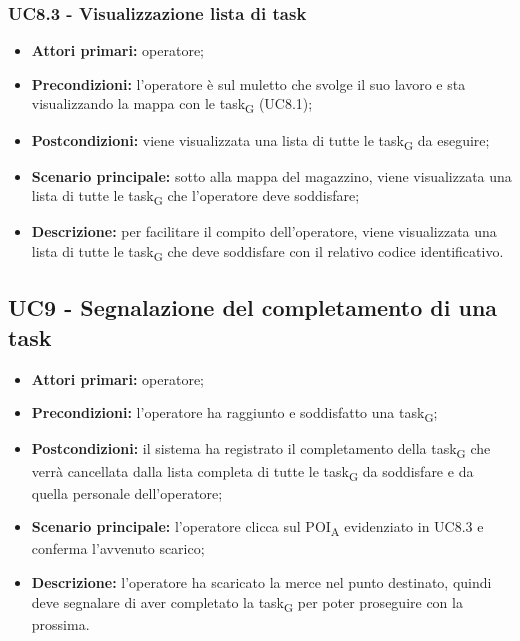\subsubsection{UC8.3 - Visualizzazione lista di task}
\begin{itemize}
	\item 	\textbf{Attori primari:} operatore;
	\item 	\textbf{Precondizioni:} l'operatore è sul muletto che svolge il suo lavoro e sta visualizzando la mappa con le task\textsubscript{G} (UC8.1);
	\item 	\textbf{Postcondizioni:} viene visualizzata una lista di tutte le task\textsubscript{G} da eseguire;
	\item 	\textbf{Scenario principale:} sotto alla mappa del magazzino, viene visualizzata una lista di tutte le task\textsubscript{G} che l'operatore deve soddisfare;
	\item 	\textbf{Descrizione:} per facilitare il compito dell'operatore, viene visualizzata una lista di tutte le task\textsubscript{G} che deve soddisfare con il relativo codice identificativo.
\end{itemize}

\subsection{UC9 - Segnalazione del completamento di una task}
\begin{itemize}
	\item 	\textbf{Attori primari:} operatore;
	\item 	\textbf{Precondizioni:} l'operatore ha raggiunto e soddisfatto una task\textsubscript{G};
	\item 	\textbf{Postcondizioni:} il sistema ha registrato il completamento della task\textsubscript{G} che verrà cancellata dalla lista completa di tutte le task\textsubscript{G} da soddisfare e da quella personale dell'operatore;
	\item 	\textbf{Scenario principale:} l'operatore clicca sul POI\textsubscript{A} evidenziato in UC8.3 e conferma l'avvenuto scarico;
	\item 	\textbf{Descrizione:} l'operatore ha scaricato la merce nel punto destinato, quindi deve segnalare di aver completato la task\textsubscript{G} per poter proseguire con la prossima.

\end{itemize}

